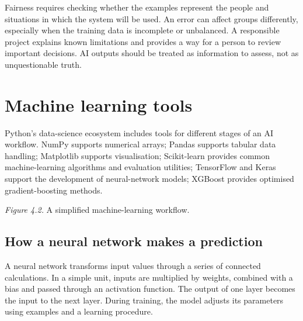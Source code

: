 \documentclass[11pt,openany,oneside]{book}
\begin{document}
Fairness requires checking whether the examples represent the people and situations in which the system will be used. An error can affect groups differently, especially when the training data is incomplete or unbalanced. A responsible project explains known limitations and provides a way for a person to review important decisions. AI outputs should be treated as information to assess, not as unquestionable truth.

\section{Machine learning tools}
Python's data-science ecosystem includes tools for different stages of an AI workflow. NumPy supports numerical arrays; Pandas supports tabular data handling; Matplotlib supports visualisation; Scikit-learn provides common machine-learning algorithms and evaluation utilities; TensorFlow and Keras support the development of neural-network models; XGBoost provides optimised gradient-boosting methods.

\begin{center}
\end{center}
\textit{Figure 4.2.} A simplified machine-learning workflow.

\subsection{How a neural network makes a prediction}
A neural network transforms input values through a series of connected calculations. In a simple unit, inputs are multiplied by weights, combined with a bias and passed through an activation function. The output of one layer becomes the input to the next layer. During training, the model adjusts its parameters using examples and a learning procedure.
\end{document}

